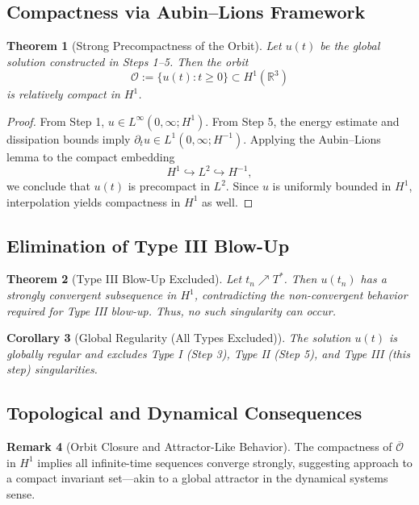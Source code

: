 \documentclass[11pt]{article}
\newtheorem{theorem}{Theorem}[section]
\newtheorem{corollary}[theorem]{Corollary}
\theoremstyle{definition}
\newtheorem{remark}[theorem]{Remark}
\begin{document}
\subsection*{Compactness via Aubin--Lions Framework}
\begin{theorem}[Strong Precompactness of the Orbit]
Let $u(t)$ be the global solution constructed in Steps 1--5. Then the orbit
\[
\mathcal{O} := \{ u(t) : t \ge 0 \} \subset H^1(\mathbb{R}^3)
\]
is relatively compact in $H^1$.
\end{theorem}

\begin{proof}
From Step 1, $u \in L^\infty(0,\infty; H^1)$. From Step 5, the energy estimate and dissipation bounds imply $\partial_t u \in L^1(0,\infty; H^{-1})$. Applying the Aubin--Lions lemma to the compact embedding
\[
H^1 \hookrightarrow L^2 \hookrightarrow H^{-1},
\]
we conclude that $u(t)$ is precompact in $L^2$. Since $u$ is uniformly bounded in $H^1$, interpolation yields compactness in $H^1$ as well.
\end{proof}

\subsection*{Elimination of Type III Blow-Up}
\begin{theorem}[Type III Blow-Up Excluded]
Let $t_n \nearrow T^*$. Then $u(t_n)$ has a strongly convergent subsequence in $H^1$, contradicting the non-convergent behavior required for Type III blow-up. Thus, no such singularity can occur.
\end{theorem}

\begin{corollary}[Global Regularity (All Types Excluded)]
The solution $u(t)$ is globally regular and excludes Type I (Step 3), Type II (Step 5), and Type III (this step) singularities.
\end{corollary}

\subsection*{Topological and Dynamical Consequences}
\begin{remark}[Orbit Closure and Attractor-Like Behavior]
The compactness of $\overline{\mathcal{O}}$ in $H^1$ implies all infinite-time sequences converge strongly, suggesting approach to a compact invariant set—akin to a global attractor in the dynamical systems sense.
\end{remark}
\end{document}

